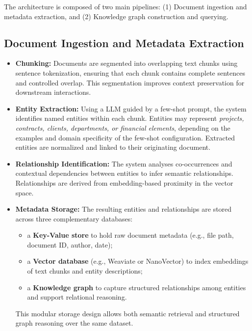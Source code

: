 The architecture is composed of two main pipelines:  
(1) Document ingestion and metadata extraction, and  
(2) Knowledge graph construction and querying.

\subsection{Document Ingestion and Metadata Extraction}

\begin{itemize}
    \item \textbf{Chunking:} Documents are segmented into overlapping text chunks using sentence tokenization, ensuring that each chunk contains complete sentences and controlled overlap. This segmentation improves context preservation for downstream interactions.
    
    \item \textbf{Entity Extraction:} Using a \gls{LLM} guided by a few-shot prompt, the system identifies named entities within each chunk. Entities may represent \textit{projects, contracts, clients, departments, or financial elements}, depending on the examples and domain specificity of the few-shot configuration. Extracted entities are normalized and linked to their originating document.
    
    \item \textbf{Relationship Identification:} The system analyses co-occurrences and contextual dependencies between entities to infer semantic relationships. Relationships are derived from embedding-based proximity in the vector space.
    
    \item \textbf{Metadata Storage:} The resulting entities and relationships are stored across three complementary databases:
    \begin{itemize}
        \item a \textbf{Key-Value store} to hold raw document metadata (e.g., file path, document ID, author, date);
        \item a \textbf{Vector database} (e.g., Weaviate or NanoVector) to index embeddings of text chunks and entity descriptions;
        \item a \textbf{Knowledge graph} to capture structured relationships among entities and support relational reasoning.
    \end{itemize}
    This modular storage design allows both semantic retrieval and structured graph reasoning over the same dataset.
\end{itemize}
